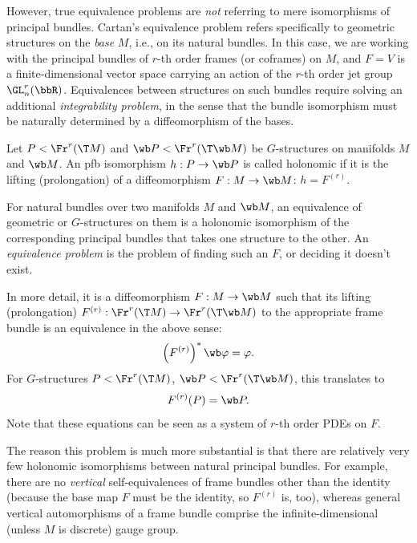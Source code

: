 However, true equivalence problems are \emph{not} referring to mere isomorphisms of principal bundles. Cartan's equivalence problem refers specifically to geometric structures on the \emph{base} $M$, i.e., on its natural bundles. In this case, we are working with the principal bundles of $r$-th order frames (or coframes) on $M$, and $F=V$ is a finite-dimensional vector space carrying an action of the $r$-th order jet group $\GL^r_n(\bbR)$. Equivalences between structures on such bundles require solving an additional \emph{integrability problem}, in the sense that the bundle isomorphism must be naturally determined by a diffeomorphism of the bases.

\begin{defn}
    Let $P<\Fr^r(\T M)$ and $\wb P<\Fr^r(\T \wb M)$ be $G$-structures on manifolds $M$ and $\wb M$. An \gls{pfb} isomorphism $h:P\to \wb P$ is called holonomic if it is the lifting (prolongation) of a diffeomorphism $F:M\to \wb M$: $h=F^{(r)}$.
\end{defn}

\begin{defn}[Equivalence]
    For natural bundles over two manifolds $M$ and $\wb M$, an equivalence of geometric or $G$-structures on them is a holonomic isomorphism of the corresponding principal bundles that takes one structure to the other. An \emph{equivalence problem} is the problem of finding such an $F$, or deciding it doesn't exist.    
\end{defn}

In more detail, it is a diffeomorphism $F:M\to \wb M$ such that its lifting (prolongation) $F^{(r)}:\Fr^r(\T M)\to \Fr^r(\T \wb M)$ to the appropriate frame bundle is an equivalence in the above sense:
\[\left(F^{(r)}\right)^\ast \wb\varphi=\varphi.\]
For $G$-structures $P<\Fr^r(\T M)$, $\wb P<\Fr^r(\T \wb M)$, this translates to 
\[F^{(r)}(P)=\wb P.\]
Note that these equations can be seen as a system of $r$-th order PDEs on $F$.

The reason this problem is much more substantial is that there are relatively very few holonomic isomorphisms between natural principal bundles. For example, there are no \emph{vertical} self-equivalences of frame bundles other than the identity (because the base map $F$ must be the identity, so $F^{(r)}$ is, too), whereas general vertical automorphisms of a frame bundle comprise the infinite-dimensional (unless $M$ is discrete) gauge group. 

